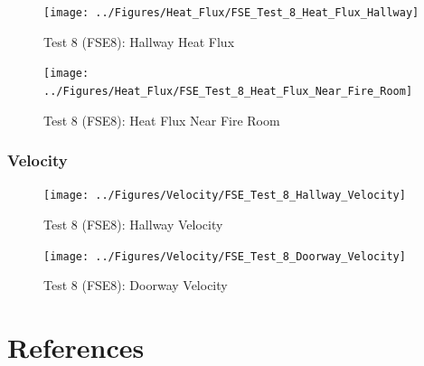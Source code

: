 \documentclass[12pt,oneside]{book}
\begin{document}
\begin{figure}[!ht]
	\texttt{[image: ../Figures/Heat\_Flux/FSE\_Test\_8\_Heat\_Flux\_Hallway]}
	\caption{Test 8 (FSE8): Hallway Heat Flux}
	\label{fig:Test_8_Hallway_Heat_Flux}
\end{figure}

\begin{figure}[!ht]
	\texttt{[image: ../Figures/Heat\_Flux/FSE\_Test\_8\_Heat\_Flux\_Near\_Fire\_Room]}
	\caption{Test 8 (FSE8): Heat Flux Near Fire Room}
	\label{fig:Test_8_Heat_Flux_Near_Fire_Room}
\end{figure}

\subsection{Velocity}
\label{subsec:Velocity}

\begin{figure}[!ht]
	\texttt{[image: ../Figures/Velocity/FSE\_Test\_8\_Hallway\_Velocity]}
	\caption{Test 8 (FSE8): Hallway Velocity}
	\label{fig:Test_8_Hallway_Velocity}
\end{figure}

\begin{figure}[!ht]
	\texttt{[image: ../Figures/Velocity/FSE\_Test\_8\_Doorway\_Velocity]}
	\caption{Test 8 (FSE8): Doorway Velocity}
	\label{fig:Test_8_Doorway_Velocity}
\end{figure}

\clearpage

\chapter{References}
\label{chap:References}



	
\end{document}
